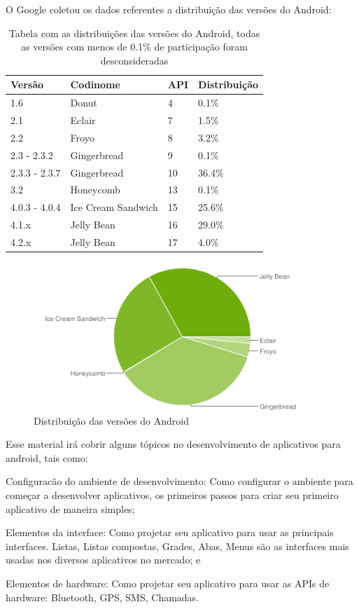 \documentclass[a4paper,12pt,brazil,doubleside]{book}
\begin{document}
O Google coletou os dados referentes a distribuição das versões do Android:
\begin{table}[H]
\centering
    \begin{tabular}{|l|l|l|l|}
     \rowcolor{Gray} \hline 
    Versão        & Codinome           & API & Distribuição \\ \hline
    1.6           & Donut              & 4   & 0.1\%        \\ \hline
    2.1           & Eclair             & 7   & 1.5\%        \\ \hline
    2.2           & Froyo              & 8   & 3.2\%        \\ \hline
    2.3 - 2.3.2   & Gingerbread        & 9   & 0.1\%        \\ \hline
    2.3.3 - 2.3.7 & Gingerbread        & 10  & 36.4\%       \\ \hline
    3.2           & Honeycomb          & 13  & 0.1\%        \\ \hline
    4.0.3 - 4.0.4 & Ice Cream Sandwich & 15  & 25.6\%       \\ \hline
    4.1.x         & Jelly Bean         & 16  & 29.0\%       \\ \hline
    4.2.x         & Jelly Bean         & 17  & 4.0\%        \\ \hline
    \end{tabular}
    \caption{Tabela com as distribuições das versões do Android, todas as versões com menos de 0.1\% de participação foram desconsideradas}
\end{table}

\begin{figure}[H]
  \centering
  \includegraphics[width=.85\textwidth]{figuras/chart.png}
  \caption{Distribuição das versões do Android}
  \label{fig:d}
\end{figure}

\newpage
Esse material irá cobrir alguns tópicos no desenvolvimento de aplicativos para android, tais como:
\bi
\item
Configuracão do ambiente de desenvolvimento: Como configurar o ambiente para começar a desenvolver aplicativos, os primeiros passos para criar seu primeiro aplicativo de maneira simples;
\item
Elementos da interface: Como projetar seu aplicativo para usar as principais interfaces. Listas, Listas compostas, Grades, Abas, Menus são as interfaces mais usadas nos diversos aplicativos no mercado; e
\item
Elementos de hardware: Como projetar seu aplicativo para usar as APIs de hardware: Bluetooth, GPS, SMS, Chamadas.
\ei
\end{document}
